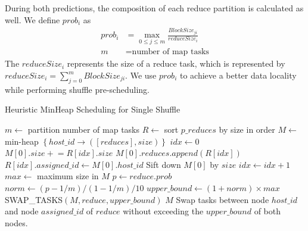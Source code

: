 During both predictions, the composition of each reduce partition is calculated as well. We define $prob_i$ as
\begin{equation}
\label{equationprob}
\begin{aligned}
	prob_i &= \max_{0 \leq j \leq m} \frac{BlockSize_{ji}}{reduceSize_i} \\
	m &= \text{number of map tasks}
\end{aligned}
\end{equation}
The $reduceSize_i$ represents the size of a reduce task, which is represented by $reduceSize_i = \sum_{j=0}^{m} {BlockSize_{ji}}$.
We use $prob_i$ to achieve a better data locality while performing shuffle pre-scheduling. 

\begin{minipage}{0.95\columnwidth}
\begin{algorithm}[H]
\caption{Heuristic MinHeap Scheduling for Single Shuffle}
\label{hminheap}
	\begin{algorithmic}[1]
	\small
		\State $m\gets$ partition number of map tasks
		\State $R\gets$ sort $p\_reduces$ by size in  order
		\State $M\gets$ min-heap $\left\{ host\_id \rightarrow \left( \left[ reduces \right], size \right) \right\}$
		\State $idx\gets 0$
		\State $M\left[0\right].size \mathrel{+}= R\left[idx\right].size$
		\State $M\left[0\right].reduces.append\left(R\left[idx\right]\right)$
		\State $R\left[idx\right].assigned\_id \gets M \left[0\right].host\_id$
		\State Sift down $M\left[0\right]$ by $size$
		\State $idx\gets idx+1$
		\EndWhile
		\State $max\gets$ maximum size in $M$
				\State $p\gets reduce.prob$
				\State $norm\gets \left(p-1/m\right)/\left(1-1/m\right)/10$
				\State $upper\_bound \gets \left(1 + norm\right) \times max$
				\State SWAP\_TASKS$\left(M, reduce, upper\_bound\right)$
			\EndIf
		\EndFor\newline
		\Return $M$
	\EndProcedure
		\State Swap tasks between node $host\_id$ and node $assigned\_id$
		\State of $reduce$ without exceeding the $upper\_bound$
		\State of both nodes.\newline
		\Return
	\EndProcedure
	\end{algorithmic}
\end{algorithm}
\end{minipage}


